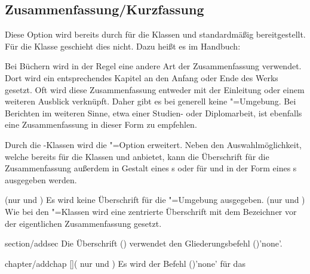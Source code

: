 \begin{Declaration*}{}
\begin{Declaration*}{}
\begin{Declaration*}{}
\subsection{Zusammenfassung/Kurzfassung}
%
%
\begin{Declaration}[%
  v2.02!\Option{abstract=multiple}:ersetzt \Option{abstract=double};%
  v2.02!\Option{abstract=tocleveldown};%
  v2.02!\Option{abstract=markboth};%
  v2.04!\Option{abstract=tocmultiple}%
]{}%
\printdeclarationlist%
%
%
Diese Option wird bereits durch \KOMAScript{} für die Klassen  
und  standardmäßig bereitgestellt. Für die Klasse 
 geschieht dies nicht. Dazu heißt es im Handbuch:
%
\begin{quoting}
Bei Büchern wird in der Regel eine andere Art der Zusammenfassung verwendet. 
Dort wird ein entsprechendes Kapitel an den Anfang oder Ende des Werks gesetzt. 
Oft wird diese Zusammenfassung entweder mit der Einleitung oder einem weiteren 
Ausblick verknüpft. Daher gibt es bei  generell keine 
"=Umgebung. Bei Berichten im weiteren Sinne, etwa einer 
Studien- oder Diplomarbeit, ist ebenfalls eine Zusammenfassung in dieser Form 
zu empfehlen.
\end{quoting}
%
Durch die \TUDScript-Klassen wird die "=Option erweitert. 
Neben den Auswahlmöglichkeit, welche bereits \KOMAScript{} für die Klassen 
 und  anbietet, kann die Überschrift für 
die Zusammenfassung außerdem in Gestalt eines \sectionautorefname{}s oder für 
 und  in der Form eines 
\chapterautorefname{}s ausgegeben werden.
%
\begin{values}{}
\itemfalse(nur  und )
  Es wird keine Überschrift für die "=Umgebung ausgegeben.
\itemtrue*(nur  und )
  Wie bei den \KOMAScript"=Klassen wird eine zentrierte Überschrift mit dem 
  Bezeichner  vor der eigentlichen Zusammenfassung gesetzt.
\item[section/addsec]
  Die Überschrift () verwendet den Gliederungsbefehl 
  ()'none'.
\item[chapter/addchap][\Class{tudscrbook}](%
    nur  und %
  )
  Es wird der Befehl ()'none' für das 

\end{values}
\end{Declaration}
\end{Declaration*}
\end{Declaration*}
\end{Declaration*}
